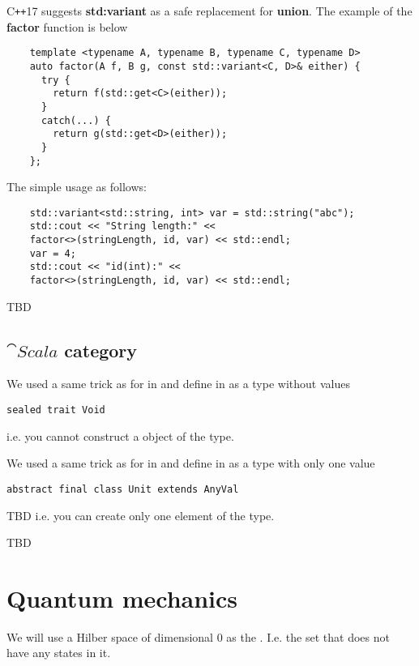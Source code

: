 \begin{example}
  C\texttt{++}17 suggests \textbf{std:variant} as a safe replacement
  for \textbf{union}. The example of the \textbf{factor}
  function is below
  \begin{verbatim}
    template <typename A, typename B, typename C, typename D>
    auto factor(A f, B g, const std::variant<C, D>& either) {
      try {
        return f(std::get<C>(either));               
      }
      catch(...) {
        return g(std::get<D>(either));                              
      }
    };
  \end{verbatim}
  The simple usage as follows:
  \begin{verbatim}
    std::variant<std::string, int> var = std::string("abc");
    std::cout << "String length:" <<
    factor<>(stringLength, id, var) << std::endl;
    var = 4;
    std::cout << "id(int):" <<
    factor<>(stringLength, id, var) << std::endl;    
  \end{verbatim}

\end{example}
TBD
\subsection{$\cat{Scala}$ category}
\begin{example}
\label{ex:scala_initial_object}
We used a same trick as for  in
 and define
 in  as a
type without values 
\begin{verbatim}
sealed trait Void
\end{verbatim}
i.e. you cannot construct a object of the type.
\end{example}

\begin{example}
\label{ex:scala_terminal_object}
We used a same trick as for 
in  and define
 in  as a
type with only one value
\begin{verbatim}
abstract final class Unit extends AnyVal
\end{verbatim}
TBD
i.e. you can create only one element of the type.
\end{example}

TBD

\section{Quantum mechanics}
\begin{example}
\label{ex:quant_initial_object}
We will use a Hilber space of dimensional 0 as the
. I.e. the set that does not have any
states in it.
\end{example}

